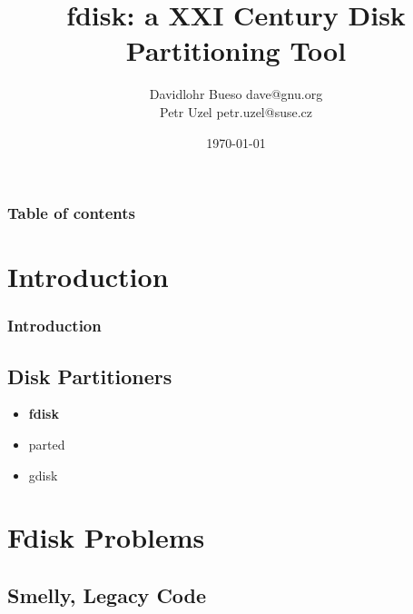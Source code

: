 \documentclass{beamer}
\begin{document}
\title{fdisk: a XXI Century Disk Partitioning Tool}  
\author{Davidlohr Bueso dave@gnu.org \\ Petr Uzel petr.uzel@suse.cz}
\date{\today} 

\begin{frame}
\titlepage
\end{frame}

\begin{frame}\frametitle{Table of contents}\tableofcontents
\end{frame} 

\section{Introduction} 
\begin{frame}\frametitle{Introduction}

\end{frame}
\subsection{Disk Partitioners}
\begin{frame}
\begin{itemize}
\item \textbf{fdisk}
\item parted
\item gdisk
\end{itemize}
\end{frame}


\section{Fdisk Problems} 
\subsection{Smelly, Legacy Code}
\end{document}
